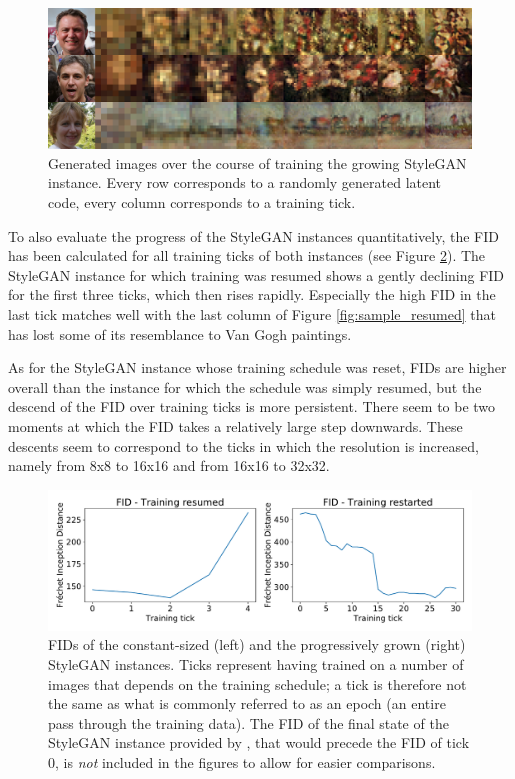 \documentclass{article}
\begin{document}
\begin{figure}
    \centering
    \includegraphics[width=0.8\linewidth]{report/img/retrain_morphing.png}
    \caption{Generated images over the course of training the growing StyleGAN instance. Every row corresponds to a randomly generated latent code, every column corresponds to a training tick.}
    \label{fig:sample_restarted}
\end{figure}

To also evaluate the progress of the StyleGAN instances quantitatively, the FID has been calculated for all training ticks of both instances (see Figure \ref{fig:fids}). The StyleGAN instance for which training was resumed shows a gently declining FID for the first three ticks, which then rises rapidly. Especially the high FID in the last tick matches well with the last column of Figure \ref{fig:sample_resumed} that has lost some of its resemblance to Van Gogh paintings.

As for the StyleGAN instance whose training schedule was reset, FIDs are higher overall than the instance for which the schedule was simply resumed, but the descend of the FID over training ticks is more persistent. There seem to be two moments at which the FID takes a relatively large step downwards. These descents seem to correspond to the ticks in which the resolution is increased, namely from 8x8 to 16x16 and from 16x16 to 32x32.

\begin{figure}
    \centering
    \includegraphics[width=\linewidth]{report/img/fids.pdf}
    \caption{FIDs of the constant-sized (left) and the progressively grown (right) StyleGAN instances. Ticks represent having trained on a number of images that depends on the training schedule; a tick is therefore not the same as what is commonly referred to as an epoch (an entire pass through the training data). The FID of the final state of the StyleGAN instance provided by \cite{karras2019stylebased}, that would precede the FID of tick 0, is \textit{not} included in the figures to allow for easier comparisons.}
    \label{fig:fids}
\end{figure}
\end{document}
